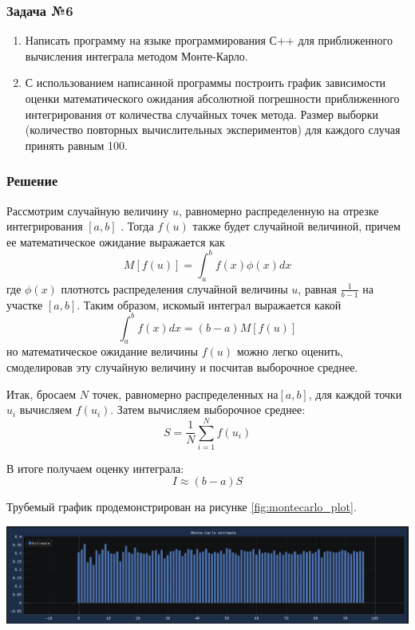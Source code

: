 \documentclass[a4paper, fontsize=14pt]{article}
\begin{document}
\subsubsection*{Задача №6}
\begin{enumerate}
    \item Написать программу на языке программирования С++ для
приближенного вычисления интеграла методом Монте-Карло.
    \item С использованием написанной программы построить график
    зависимости оценки математического ожидания абсолютной
    погрешности приближенного интегрирования от количества случайных
    точек метода. Размер выборки (количество повторных вычислительных
    экспериментов) для каждого случая принять равным 100.
\end{enumerate}
\subsubsection*{Решение}

Рассмотрим случайную величину $u$, равномерно распределенную на отрезке интегрирования
$[a,b]$ . Тогда $f(u)$ также будет случайной величиной, причем ее математическое ожидание
выражается как 
\begin{equation*}
    M[f(u)] = \int_a^b f(x) \phi(x) dx
\end{equation*}
где $\phi(x)$ плотнотсь распределения случайной величины $u$, равная $\frac{1}{b-1}$ на участке $[a,b]$.
Таким образом, искомый интеграл выражается какой
\begin{equation*}
    \int_a^b f(x) dx = (b - a) M[f(u)]
\end{equation*}
но математическое ожидание величины $f(u)$ можно легко оценить, смоделировав эту
случайную величину и посчитав выборочное среднее.

Итак, бросаем $N$ точек, равномерно распределенных на$[a, b]$, для каждой точки $u_i$ вычисляем
$f(u_i)$. Затем вычисляем выборочное среднее:
\begin{equation*}
    S = \frac{1}{N} \sum_{i=1}^N f(u_i)
\end{equation*}

В итоге получаем оценку интеграла:
\begin{equation*}
    I \approx (b-a) S
\end{equation*}

Трубемый график продемонстрирован на рисунке \ref{fig:montecarlo_plot}.
\begin{center}
    \includegraphics[scale=0.6]{src/monte_carlo_est.png}
    \label{fig:montecarlo_plot}
\end{center}
\newpage
\end{document}
